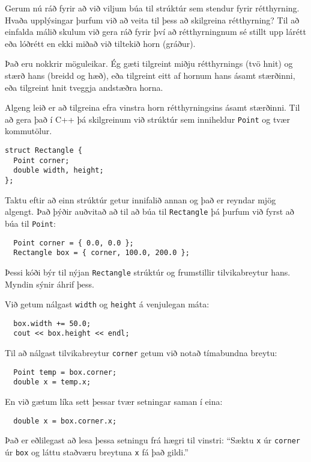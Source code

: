 Gerum nú ráð fyrir að við viljum búa til strúktúr sem stendur fyrir rétthyrning.
Hvaða upplýsingar þurfum við að veita til þess að skilgreina rétthyrning?
Til að einfalda málið skulum við gera ráð fyrir því að rétthyrningnum sé stillt upp lárétt eða lóðrétt en ekki miðað við tiltekið horn (gráður).

Það eru nokkrir möguleikar.
Ég gæti tilgreint miðju rétthyrnings (tvö hnit) og stærð hans (breidd og hæð), eða tilgreint eitt af hornum hans ásamt stærðinni, eða tilgreint hnit tveggja andstæðra horna.

Algeng leið er að tilgreina efra vinstra horn rétthyrningsins ásamt stærðinni.
Til að gera það í C++ þá skilgreinum við strúktúr sem inniheldur {\tt Point} og tvær kommutölur.

\begin{verbatim}
struct Rectangle {
  Point corner;
  double width, height;
};  
\end{verbatim}
%
Taktu eftir að einn strúktúr getur innifalið annan og það er reyndar mjög algengt.
Það þýðir auðvitað að til að búa til {\tt Rectangle} þá þurfum við fyrst að búa til {\tt Point}:

\begin{verbatim}
  Point corner = { 0.0, 0.0 };
  Rectangle box = { corner, 100.0, 200.0 };
\end{verbatim}
%
Þessi kóði býr til nýjan {\tt Rectangle} strúktúr og frumstillir tilvikabreytur hans.
Myndin sýnir áhrif þess.

\vspace{0.1in}
\centerline{}
\vspace{0.1in}
%
Við getum nálgast {\tt width} og {\tt height} á venjulegan máta:

\begin{verbatim}
  box.width += 50.0;
  cout << box.height << endl;
\end{verbatim}
%
Til að nálgast tilvikabreytur {\tt corner} getum við notað tímabundna breytu:

\begin{verbatim}
  Point temp = box.corner;
  double x = temp.x;
\end{verbatim}
%
En við gætum líka sett þessar tvær setningar saman í eina:


\begin{verbatim}
  double x = box.corner.x;
\end{verbatim}
%
Það er eðlilegast að lesa þessa setningu frá hægri til vinstri: 
``Sæktu {\tt x} úr {\tt corner} úr {\tt box} og láttu staðværu breytuna {\tt x} fá það gildi.''


